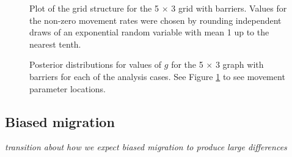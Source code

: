 \documentclass{article}
\newcommand{\plr}[1]{{\em \color{blue} #1}}
\begin{document}

\begin{figure}
\centering
\caption{Plot of the grid structure 
for the 5 $\times$ 3 grid with barriers.
Values for the non-zero movement rates 
were chosen by rounding independent draws of an exponential random variable with mean 1 
up to the nearest tenth.}
\label{fig:5x3b_grid}
\end{figure}

\begin{figure}
\centering
\caption{Posterior distributions for values of $g$ 
for the 5 $\times$ 3 graph with barriers 
for each of the analysis cases.
See Figure \ref{fig:5x3b_grid} to see movement parameter locations.}
\label{fig:5x3boxplots}
\end{figure}


\subsection*{Biased migration}
\label{sec:comvcoal}

\plr{transition about how we expect biased migration to produce large differences}
\end{document}
